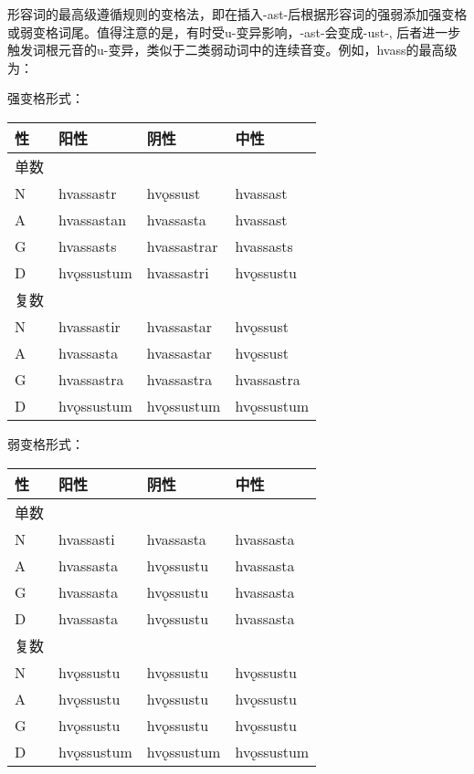 形容词的最高级遵循规则的变格法，即在插入-ast-后根据形容词的强弱添加强变格或弱变格词尾。值得注意的是，有时受u-变异影响，-ast-会变成-ust-, 后者进一步触发词根元音的u-变异，类似于二类弱动词中的连续音变。例如，hvass的最高级为：

强变格形式：

\begin{longtable}{llll}
    \toprule
    性   & 阳性       & 阴性        & 中性       \\
    \midrule
    \endhead
    \bottomrule
    \endfoot
    单数 &            &             &            \\
    N    & hvassastr  & hvǫssust    & hvassast   \\
    A    & hvassastan & hvassasta   & hvassast   \\
    G    & hvassasts  & hvassastrar & hvassasts  \\
    D    & hvǫssustum & hvassastri  & hvǫssustu  \\
    复数 &            &             &            \\
    N    & hvassastir & hvassastar  & hvǫssust   \\
    A    & hvassasta  & hvassastar  & hvǫssust   \\
    G    & hvassastra & hvassastra  & hvassastra \\
    D    & hvǫssustum & hvǫssustum  & hvǫssustum \\
\end{longtable}

弱变格形式：

\begin{longtable}{llll}
    \toprule
    性   & 阳性       & 阴性       & 中性       \\
    \midrule
    \endhead
    \bottomrule
    \endfoot
    单数 &            &            &            \\
    N    & hvassasti  & hvassasta  & hvassasta  \\
    A    & hvassasta  & hvǫssustu  & hvassasta  \\
    G    & hvassasta  & hvǫssustu  & hvassasta  \\
    D    & hvassasta  & hvǫssustu  & hvassasta  \\
    复数 &            &            &            \\
    N    & hvǫssustu  & hvǫssustu  & hvǫssustu  \\
    A    & hvǫssustu  & hvǫssustu  & hvǫssustu  \\
    G    & hvǫssustu  & hvǫssustu  & hvǫssustu  \\
    D    & hvǫssustum & hvǫssustum & hvǫssustum \\
\end{longtable}


